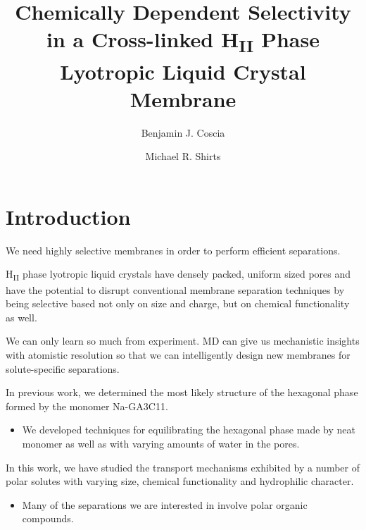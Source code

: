 \documentclass{article}
\title{Chemically Dependent Selectivity in a Cross-linked H\textsubscript{II} Phase Lyotropic Liquid Crystal Membrane}
\author{Benjamin J. Coscia \and Michael R. Shirts}
\begin{document}
  \graphicspath{{./figures/}}
  \maketitle

  \section{Introduction}

  We need highly selective membranes in order to perform efficient separations.

  H\textsubscript{II} phase lyotropic liquid crystals have densely packed, uniform
  sized pores and have the potential to disrupt conventional membrane separation
  techniques by being selective based not only on size and charge, but on chemical
  functionality as well.

  We can only learn so much from experiment. MD can give us mechanistic insights with
  atomistic resolution so that we can intelligently design new membranes for 
  solute-specific separations.

  In previous work, we determined the most likely structure of the hexagonal phase 
  formed by the monomer Na-GA3C11.
  \begin{itemize}
  	\item We developed techniques for equilibrating the hexagonal phase made by
	neat monomer as well as with varying amounts of water in the pores.
  \end{itemize} 

  In this work, we have studied the transport mechanisms exhibited by a number
  of polar solutes with varying size, chemical functionality and hydrophilic character.
  \begin{itemize}
	\item Many of the separations we are interested in involve polar organic 
	compounds.
  \end{itemize} 
  
\end{document}
